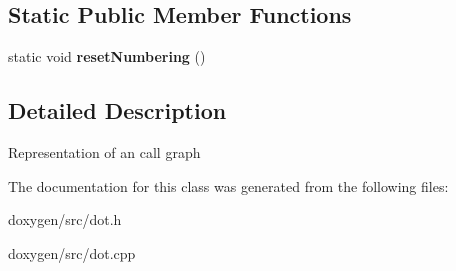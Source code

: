 \subsection*{Static Public Member Functions}
\begin{DoxyCompactItemize}
\item 
\mbox{\label{class_dot_call_graph_aa2f923dbf1cf7d4f5481666741b675c4}} 
static void {\bfseries reset\+Numbering} ()
\end{DoxyCompactItemize}


\subsection{Detailed Description}
Representation of an call graph 

The documentation for this class was generated from the following files\+:\begin{DoxyCompactItemize}
\item 
doxygen/src/dot.\+h\item 
doxygen/src/dot.\+cpp\end{DoxyCompactItemize}
